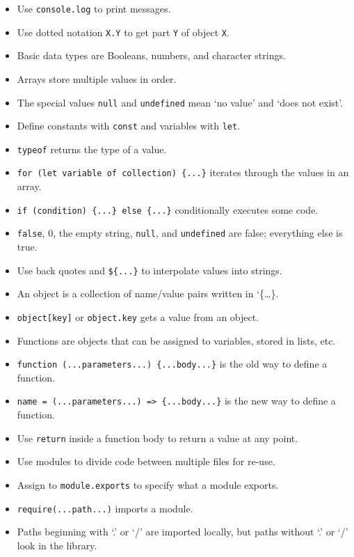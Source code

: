 \begin{itemize}
\tightlist
\item
  Use \texttt{console.log} to print messages.
\item
  Use dotted notation \texttt{X.Y} to get part \texttt{Y} of object
  \texttt{X}.
\item
  Basic data types are Booleans, numbers, and character strings.
\item
  Arrays store multiple values in order.
\item
  The special values \texttt{null} and \texttt{undefined} mean `no
  value' and `does not exist'.
\item
  Define constants with \texttt{const} and variables with \texttt{let}.
\item
  \texttt{typeof} returns the type of a value.
\item
  \texttt{for\ (let\ variable\ of\ collection)\ \{...\}} iterates
  through the values in an array.
\item
  \texttt{if\ (condition)\ \{...\}\ else\ \{...\}} conditionally
  executes some code.
\item
  \texttt{false}, 0, the empty string, \texttt{null}, and
  \texttt{undefined} are false; everything else is true.
\item
  Use back quotes and \texttt{\$\{...\}} to interpolate values into
  strings.
\item
  An object is a collection of name/value pairs written in
  `\{\ldots{}\}.
\item
  \texttt{object{[}key{]}} or \texttt{object.key} gets a value from an
  object.
\item
  Functions are objects that can be assigned to variables, stored in
  lists, etc.
\item
  \texttt{function\ (...parameters...)\ \{...body...\}} is the old way
  to define a function.
\item
  \texttt{name\ =\ (...parameters...)\ =\textgreater{}\ \{...body...\}}
  is the new way to define a function.
\item
  Use \texttt{return} inside a function body to return a value at any
  point.
\item
  Use modules to divide code between multiple files for re-use.
\item
  Assign to \texttt{module.exports} to specify what a module exports.
\item
  \texttt{require(...path...)} imports a module.
\item
  Paths beginning with `.' or `/' are imported locally, but paths
  without `.' or `/' look in the library.
\end{itemize}

